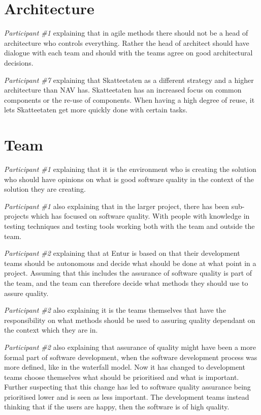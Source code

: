 \section{Architecture}
\textit{Participant \#1} explaining that in agile methods there should not be a head of architecture who controls everything. Rather the head of architect should have dialogue with each team and should with the teams agree on good architectural decisions. 

\textit{Participant \#7} explaining that Skatteetaten as a different strategy and a higher architecture than NAV has. Skatteetaten has an increased focus on common components or the re-use of components. When having a high degree of reuse, it lets Skatteetaten get more quickly done with certain tasks.

\section{Team}
\textit{Participant \#1} explaining that it is the environment who is creating the solution who should have opinions on what is good software quality in the context of the solution they are creating.

\textit{Participant \#1} also explaining that in the larger project, there has been sub-projects which has focused on software quality. With people with knowledge in testing techniques and testing tools working both with the team and outside the team.

\textit{Participant \#2} explaining that at Entur is based on that their development teams should be autonomous and decide what should be done at what point in a project. Assuming that this includes the assurance of software quality is part of the team, and the team can therefore decide what methods they should use to assure quality.

\textit{Participant \#2} also explaining it is the teams themselves that have the responsibility on what methods should be used to assuring quality dependant on the context which they are in.

\textit{Participant \#2} also explaining that assurance of quality might have been a more formal part of software development, when the software development process was more defined, like in the waterfall model. Now it has changed to development teams choose themselves what should be prioritised and what is important. Further suspecting that this change has led to software quality assurance being prioritised lower and is seen as less important. The development teams instead thinking that if the users are happy, then the software is of high quality.

